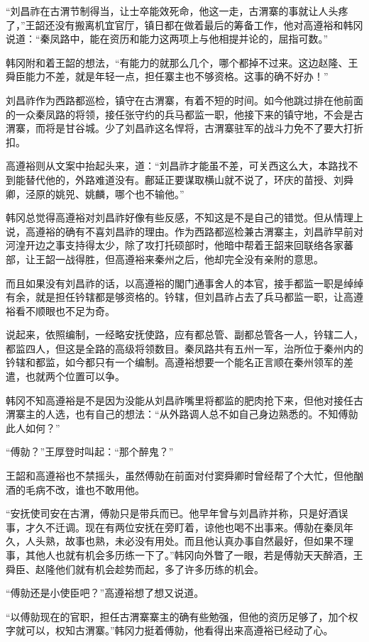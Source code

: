 “刘昌祚在古渭节制得当，让士卒能效死命，他这一走，古渭寨的事就让人头疼了，”王韶还没有搬离机宜官厅，镇日都在做着最后的筹备工作，他对高遵裕和韩冈说道：“秦凤路中，能在资历和能力这两项上与他相提并论的，屈指可数。”

韩冈附和着王韶的想法，“有能力的就那么几个，哪个都掉不过来。这边赵隆、王舜臣能力不差，就是年轻一点，担任寨主也不够资格。这事的确不好办！”

刘昌祚作为西路都巡检，镇守在古渭寨，有着不短的时间。如今他跳过排在他前面的一众秦凤路的将领，接任张守约的兵马都监一职，他接下来的镇守地，不会是古渭寨，而将是甘谷城。少了刘昌祚这名悍将，古渭寨驻军的战斗力免不了要大打折扣。

高遵裕则从文案中抬起头来，道：“刘昌祚才能虽不差，可关西这么大，本路找不到能替代他的，外路难道没有。鄜延正要谋取横山就不说了，环庆的苗授、刘舜卿，泾原的姚兕、姚麟，哪个也不输他。”

韩冈总觉得高遵裕对刘昌祚好像有些反感，不知这是不是自己的错觉。但从情理上说，高遵裕的确有不喜刘昌祚的理由。作为西路都巡检兼古渭寨主，刘昌祚早前对河湟开边之事支持得太少，除了攻打托硕部时，他暗中帮着王韶来回联络各家蕃部，让王韶一战得胜，但高遵裕来秦州之后，他却完全没有亲附的意思。

而且如果没有刘昌祚的话，以高遵裕的閣门通事舍人的本官，接手都监一职是绰绰有余，就是担任钤辖都是够资格的。钤辖，但刘昌祚占去了兵马都监一职，让高遵裕看不顺眼也不足为奇。

说起来，依照编制，一经略安抚使路，应有都总管、副都总管各一人，钤辖二人，都监四人，但这是全路的高级将领数目。秦凤路共有五州一军，治所位于秦州内的钤辖和都监，如今都只有一个编制。高遵裕想要一个能名正言顺在秦州领军的差遣，也就两个位置可以争。

韩冈不知高遵裕是不是因为没能从刘昌祚嘴里将都监的肥肉抢下来，但他对接任古渭寨主的人选，也有自己的想法：“从外路调人总不如自己身边熟悉的。不知傅勍此人如何？”

“傅勍？”王厚登时叫起：“那个醉鬼？”

王韶和高遵裕也不禁摇头，虽然傅勍在前面对付窦舜卿时曾经帮了个大忙，但他酗酒的毛病不改，谁也不敢用他。

“安抚使司安在古渭，傅勍只是带兵而已。他早年曾与刘昌祚并称，只是好酒误事，才久不迁调。现在有两位安抚在旁盯着，谅他也喝不出事来。傅勍在秦凤年久，人头熟，故事也熟，未必没有用处。而且他认真办事自然最好，但如果不理事，其他人也就有机会多历练一下了。”韩冈向外瞥了一眼，若是傅勍天天醉酒，王舜臣、赵隆他们就有机会趁势而起，多了许多历练的机会。

“傅勍还是小使臣吧？”高遵裕想了想又说道。

“以傅勍现在的官职，担任古渭寨寨主的确有些勉强，但他的资历足够了，加个权字就可以，权知古渭寨。”韩冈力挺着傅勍，他看得出来高遵裕已经动了心。

